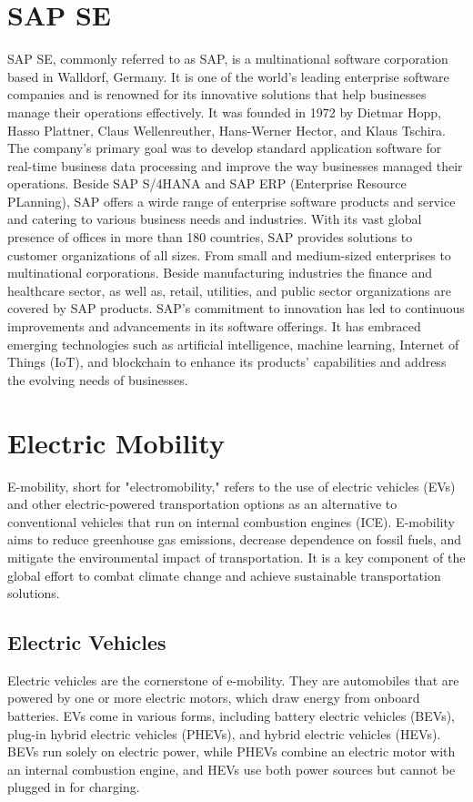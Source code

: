\section{SAP SE}
\label{ch:Introduction:sec:SAP SE}
SAP SE, commonly referred to as SAP, is a multinational software corporation based in Walldorf, Germany. It is one of the world's leading enterprise software companies and is renowned for its innovative solutions that help businesses manage their operations effectively. It was founded in 1972 by Dietmar Hopp, Hasso Plattner, Claus Wellenreuther, Hans-Werner Hector, and Klaus Tschira. The company's primary goal was to develop standard application software for real-time business data processing and improve the way businesses managed their operations. Beside SAP S/4HANA and SAP ERP (Enterprise Resource PLanning), SAP offers a wirde range of enterprise software products and service and catering to various business needs and industries.
With its vast global presence of offices in more than 180 countries, SAP provides solutions to customer organizations of all sizes. From small and medium-sized enterprises to multinational corporations. Beside manufacturing industries the finance and healthcare sector, as well as, retail, utilities, and public sector organizations are covered by SAP products. SAP's commitment to innovation has led to continuous improvements and advancements in its software offerings. It has embraced emerging technologies such as artificial intelligence, machine learning, Internet of Things (IoT), and blockchain to enhance its products' capabilities and address the evolving needs of businesses.

\section{Electric Mobility}
\label{ch:Introduction:sec:Electric Mobility}

E-mobility, short for "electromobility," refers to the use of electric vehicles (EVs) and other electric-powered transportation options as an alternative to conventional vehicles that run on internal combustion engines (ICE). E-mobility aims to reduce greenhouse gas emissions, decrease dependence on fossil fuels, and mitigate the environmental impact of transportation. It is a key component of the global effort to combat climate change and achieve sustainable transportation solutions.

\subsection{Electric Vehicles}
\label{ch:Introduction:sec:Electric Mobility:Electric Vehicles}
Electric vehicles are the cornerstone of e-mobility. They are automobiles that are powered by one or more electric motors, which draw energy from onboard batteries. EVs come in various forms, including battery electric vehicles (BEVs), plug-in hybrid electric vehicles (PHEVs), and hybrid electric vehicles (HEVs). BEVs run solely on electric power, while PHEVs combine an electric motor with an internal combustion engine, and HEVs use both power sources but cannot be plugged in for charging.

